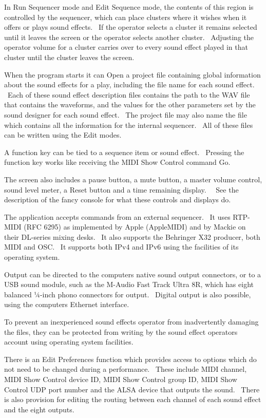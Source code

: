 \documentclass[letterpaper]{article}
\begin{document}
In Run Sequencer mode and Edit Sequence mode, the contents of this
region is controlled by the sequencer, which can place clusters where
it wishes when it offers or plays sound effects. \ If the operator
selects a cluster it remains selected until it leaves the screen or the
operator selects another cluster. \ Adjusting the operator volume for a
cluster carries over to every sound effect played in that cluster until
the cluster leaves the screen.

When the program starts it can Open a project file containing global
information about the sound effects for a play, including the file name
for each sound effect. \ Each of these sound effect description files
contains the path to the WAV file that contains the waveforms, and the
values for the other parameters set by the sound designer for each
sound effect. \ The project file may also name the file which contains
all the information for the internal sequencer. \ All of these files
can be written using the Edit modes.

A function key can be tied to a sequence item or sound effect.
\ Pressing the function key works like receiving the MIDI Show Control
command Go.

The screen also includes a pause button, a mute button, a master volume
control, sound level meter, a Reset button and a time remaining
display. \ \ See the description of the fancy console for what these
controls and displays do.

The application accepts commands from an external sequencer. \ It uses
RTP-MIDI (RFC 6295) as implemented by Apple (AppleMIDI) and by Mackie
on their DL-series mixing desks. \ It also supports the Behringer X32
producer, both MIDI and OSC. \ It supports both IPv4 and IPv6 using the
facilities of its operating system.

Output can be directed to the computer{\textquotesingle}s native sound
output connectors, or to a USB sound module, such as the M-Audio Fast
Track Ultra 8R, which has eight balanced ¼{}-inch phono connectors for
output. \ Digital output is also possible, using the
computer{\textquotesingle}s Ethernet interface.

To prevent an inexperienced sound effects operator from inadvertently
damaging the files, they can be protected from writing by the sound
effect operator{\textquotesingle}s account using operating system
facilities.

There is an Edit Preferences function which provides access to options
which do not need to be changed during a performance. \ These include
MIDI channel, MIDI Show Control device ID, MIDI Show Control group ID,
MIDI Show Control UDP port number and the ALSA device that outputs the
sound. \ There is also provision for editing the routing between each
channel of each sound effect and the eight outputs.
\end{document}
